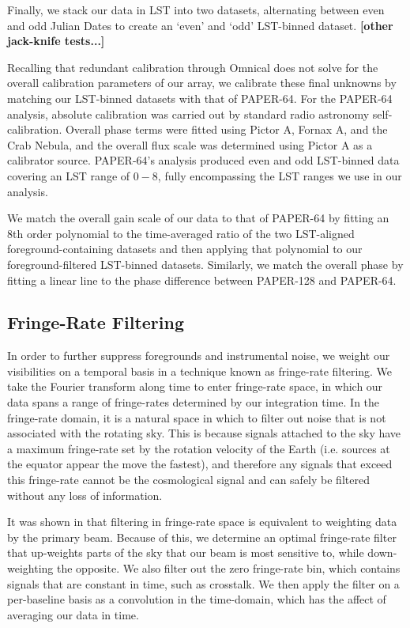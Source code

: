 \documentclass[preprint2,numberedappendix,tighten,twocolappendix]{aastex6}  %
\newcommand{\cc}[1]{{\color{purple} \textbf{[#1]}}}
\begin{document}
Finally, we stack our data in LST into two datasets, alternating between even and odd Julian Dates to create an `even' and `odd' LST-binned dataset. \cc{other jack-knife tests...}

Recalling that redundant calibration through Omnical does not solve for the overall calibration parameters of our array, we calibrate these final unknowns by matching our LST-binned datasets with that of PAPER-64. For the PAPER-64 analysis, absolute calibration was carried out by standard radio astronomy self-calibration. Overall phase terms were fitted using Pictor A, Fornax A, and the Crab Nebula, and the overall flux scale was determined using Pictor A as a calibrator source. PAPER-64's analysis produced even and odd LST-binned data covering an LST range of $0-8$, fully encompassing the LST ranges we use in our analysis. 

We match the overall gain scale of our data to that of PAPER-64 by fitting an 8th order polynomial to the time-averaged ratio of the two LST-aligned foreground-containing datasets and then applying that polynomial to our foreground-filtered LST-binned datasets. Similarly, we match the overall phase by fitting a linear line to the phase difference between PAPER-128 and PAPER-64. 

\subsection{Fringe-Rate Filtering}

In order to further suppress foregrounds and instrumental noise, we weight our visibilities on a temporal basis in a technique known as fringe-rate filtering. We take the Fourier transform along time to enter fringe-rate space, in which our data spans a range of fringe-rates determined by our integration time. In the fringe-rate domain, it is a natural space in which to filter out noise that is not associated with the rotating sky. This is because signals attached to the sky have a maximum fringe-rate set by the rotation velocity of the Earth (i.e. sources at the equator appear the move the fastest), and therefore any signals that exceed this fringe-rate cannot be the cosmological signal and can safely be filtered without any loss of information. 

It was shown in \citet{parsons_et_al2016} that filtering in fringe-rate space is equivalent to weighting data by the primary beam. Because of this, we determine an optimal fringe-rate filter that up-weights parts of the sky that our beam is most sensitive to, while down-weighting the opposite. We also filter out the zero fringe-rate bin, which contains signals that are constant in time, such as crosstalk. We then apply the filter on a per-baseline basis as a convolution in the time-domain, which has the affect of averaging our data in time. 
\end{document}

